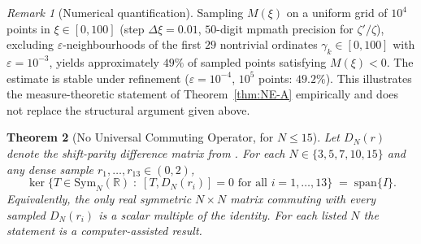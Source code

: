 \documentclass[12pt,a4paper]{article}
\newtheorem{theorem}{Theorem}[section]
\theoremstyle{definition}
\theoremstyle{remark}
\newtheorem{remark}[theorem]{Remark}
\begin{document}
\begin{remark}[Numerical quantification]
Sampling $M(\xi)$ on a uniform grid of $10^4$ points in $\xi \in [0, 100]$ (step $\Delta\xi = 0.01$, $50$-digit mpmath precision for $\zeta'/\zeta$), excluding $\varepsilon$-neighbourhoods of the first $29$ nontrivial ordinates $\gamma_k \in [0,100]$ with $\varepsilon = 10^{-3}$, yields approximately $49\%$ of sampled points satisfying $M(\xi) < 0$. The estimate is stable under refinement ($\varepsilon = 10^{-4}$, $10^5$ points: $49.2\%$). This illustrates the measure-theoretic statement of Theorem~\ref{thm:NE-A} empirically and does not replace the structural argument given above.
\end{remark}

\begin{theorem}[No Universal Commuting Operator, for $N \leq 15$]\label{thm:NE-B}
Let $D_N(r)$ denote the shift-parity difference matrix from . For each $N \in \{3, 5, 7, 10, 15\}$ and any dense sample $r_1, \ldots, r_{13} \in (0,2)$,
\[
  \ker\bigl\{T \in \mathrm{Sym}_N(\mathbb{R}) \;:\; [T, D_N(r_i)] = 0 \text{ for all } i = 1, \ldots, 13\bigr\} \;=\; \mathrm{span}\{I\}.
\]
Equivalently, the only real symmetric $N \times N$ matrix commuting with every sampled $D_N(r_i)$ is a scalar multiple of the identity. For each listed $N$ the statement is a computer-assisted result.
\end{theorem}
\end{document}
